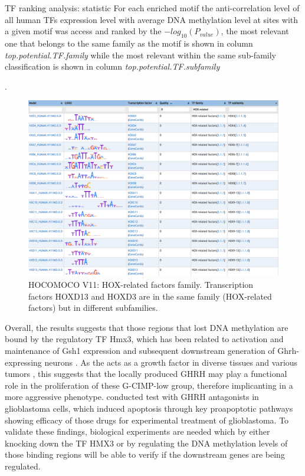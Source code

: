 \begin{table}[h!]
\centering
\caption[G-CIMP analysis: TF ranking plot]{TF ranking analysis: statistic For each enriched motif the anti-correlation level of all human TFs expression level with average DNA methylation level at sites with a given motif was access and ranked by the $-log_{10}(P_{value})$, the most relevant one that belongs to the same family as the motif is shown in column \textit{top.potential.TF.family} while the most relevant within the same sub-family classification is shown in column \textit{top.potential.TF.subfamily}}.
\label{tab:tf}
\end{table}

\begin{center}
\begin{figure}[h!]
\includegraphics[width=16cm]{images/HOCOMOCO.png}
\caption[HOCOMOCO: HOX-related factors family]{\label{tab:hocomoco}HOCOMOCO V11: HOX-related factors family. Transcription factors HOXD13 and HOXD3 are in the same family (HOX-related factors) but in different subfamilies.}
\end{figure}

\end{center}

Overall, the results suggests that those regions that lost DNA methylation are bound by the regulatory TF Hmx3,
which  has been related to activation and maintenance of Gsh1 expression and subsequent downstream generation of Ghrh-expressing neurons \cite{morales2014regionalized}. As the  acts as a growth factor in diverse tissues and various tumors \cite{barabutis2010effects}, this suggests that the locally produced GHRH may play a functional role in the proliferation of these G-CIMP-low group, therefore implicanting in a more aggressive phenotype.
 conducted test with GHRH antagonists in glioblastoma cells, which induced apoptosis through key proapoptotic pathways showing efficacy of those drugs for experimental treatment of glioblastoma.
To validate these findings, biological experiments are needed which by either knocking down the TF HMX3 or by regulating the DNA methylation levels of those binding regions will be able to verify if the downstream genes are being regulated.
